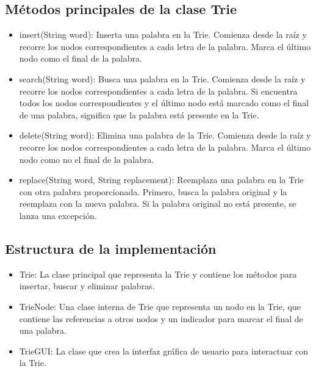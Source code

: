 \documentclass{article}
\begin{document}
	\subsection{Métodos principales de la clase Trie}
	\begin{itemize}
		\item insert(String word): Inserta una palabra en la Trie. Comienza desde la raíz y recorre los nodos correspondientes a cada letra de la palabra. Marca el último nodo como el final de la palabra.
		
		
		\item search(String word): Busca una palabra en la Trie. Comienza desde la raíz y recorre los nodos correspondientes a cada letra de la palabra. Si encuentra todos los nodos correspondientes y el último nodo está marcado como el final de una palabra, significa que la palabra está presente en la Trie.
		
		\clearpage
		\item delete(String word): Elimina una palabra de la Trie. Comienza desde la raíz y recorre los nodos correspondientes a cada letra de la palabra. Marca el último nodo como no el final de la palabra.
		
		
		\item replace(String word, String replacement): Reemplaza una palabra en la Trie con otra palabra proporcionada. Primero, busca la palabra original y la reemplaza con la nueva palabra. Si la palabra original no está presente, se lanza una excepción.
		
	\end{itemize}
	\clearpage
	
	\clearpage
	\subsection{Estructura de la implementación}
	\begin{itemize}
		\item Trie: La clase principal que representa la Trie y contiene los métodos para insertar, buscar y eliminar palabras.
		
	\item TrieNode: Una clase interna de Trie que representa un nodo en la Trie, que contiene las referencias a otros nodos y un indicador para marcar el final de una palabra.
	
	
	
	\item TrieGUI: La clase que crea la interfaz gráfica de usuario para interactuar con la Trie.
	
	
	\end{itemize}
	
\end{document}
